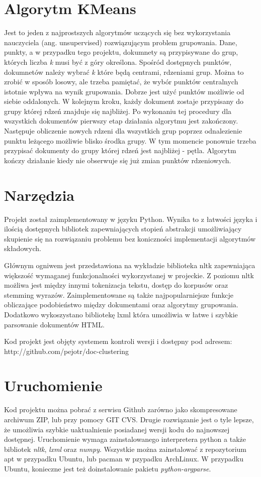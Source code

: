 \documentclass{article}
\begin{document}
\section{Algorytm KMeans}
Jest to jeden z najprostszych algorytmów uczących się bez wykorzystania nauczyciela (ang. unsupervised) rozwiązującym problem grupowania. Dane, punkty, a w przypadku tego projektu, dokumnety są przypisywane do grup, których liczba \emph{k} musi być z góry określona. Spośród dostępnych punktów, dokumnetów należy wybrać \emph{k} które będą centrami, rdzeniami grup. Można to zrobić w sposób losowy, ale trzeba pamiętać, że wybór punktów centralnych istotnie wpływa na wynik grupowania. Dobrze jest użyć punktów możliwie od siebie oddalonych. W kolejnym kroku, każdy dokument zostaje przypisany do grupy której rdzeń znajduje się najbliżej. Po wykonaniu tej procedury dla wszystkich dokumentów pierwszy etap działania algorytmu jest zakończony. Następuje obliczenie nowych rdzeni dla wszystkich grup poprzez odnalezienie punktu leżącego możliwie blisko środka grupy. W tym momencie ponownie trzeba przypisać dokumenty do grupy której rdzeń jest najbliżej - pętla. Algorytm kończy działanie kiedy nie obserwuje się już zmian punktów rdzeniowych.

\section{Narzędzia}
Projekt został zaimplementowany w języku Python. Wynika to z łatwości języka i ilością dostępnych bibliotek zapewniających stopień abstrakcji umożliwiający skupienie się na rozwiązaniu problemu bez koniczności implementacji algorytmów składowych.

Głównym ogniwem jest przedstawiona na wykładzie biblioteka nltk zapewniająca większość wymaganej funkcjonalności wykorzystanej w projeckie. Z poziomu nltk możliwa jest między innymi tokenizacja tekstu, dostęp do korpusów oraz stemming wyrazów. Zaimplementowane są także najpopularniejsze funkcje obliczające podobieństwo między dokumentami oraz algorytmy grupowania. Dodatkowo wykoszystano bibliotekę lxml która umożliwia w łatwe i szybkie parsowanie dokumentów HTML.

Kod projekt jest objęty systemem kontroli wersji i dostępny pod adresem: http://github.com/pejotr/doc-clustering

\section{Uruchomienie}
Kod projektu można pobrać z serwisu Github zarówno jako skompresowane archiwum ZIP, lub przy pomocy GIT CVS. Drugie rozwiązanie jest o tyle lepsze, że umożliwia szybkie uaktualnienie posiadanej wersji kodu do najnowszej dostępnej. Uruchomienie wymaga zainstalowanego interpretera python a także bibliotek \emph{nltk}, \emph{lxml} oraz \emph{numpy}. Wszystkie można zainstalować z repozytorium apt w przypadku Ubuntu, lub pacman w pzypadku ArchLinux. W przypadku Ubuntu, konieczne jest też doinstalowanie pakietu \emph{python-argparse}.
\end{document}
